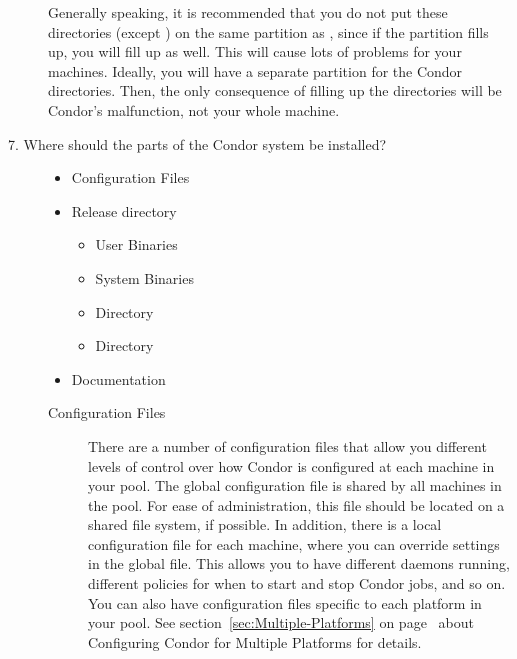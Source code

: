 \begin{description}
\begin{description}
\end{description}

Generally speaking, it is recommended that you do not put these directories
(except ) on the same partition as ,
since if the partition
fills up, you will fill up  as well. 
This will cause lots of
problems for your machines.  Ideally, you will have a separate partition
for the Condor directories. Then, the only consequence of filling up
the directories
will be Condor's malfunction, not your whole machine.

\item[7. Where should the parts of the Condor system be installed?]

	\begin{itemize}
	\item Configuration Files
	\item Release directory
		\begin{itemize}
		\item User Binaries
		\item System Binaries 
		\item {} Directory
	  	\item {} Directory
		\end{itemize}
	\item Documentation
	\end{itemize}

\label{sec:Config-File-Locations}
\begin{description}
\item[Configuration Files] There are a number of configuration files
that allow you
different levels of control over how Condor is configured at each
machine in your pool.  
The global configuration file is shared by all machines in the pool.
For ease of administration, this file should be located on a shared
file system, if possible.
In addition, there is a local
configuration file for each machine, where you can override settings in the
global file.  This allows you to have different daemons running,
different policies for when to start and stop Condor jobs, and so on.
You can also have configuration files specific to each platform in your pool.
See
section~\ref{sec:Multiple-Platforms} on
page~\pageref{sec:Multiple-Platforms} about Configuring Condor for
Multiple Platforms for details.


\end{description}
\end{description}
